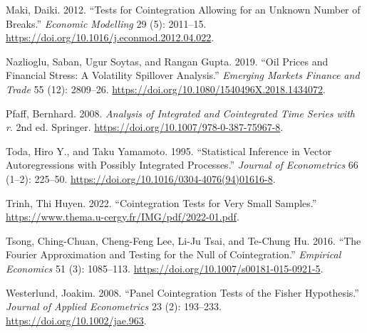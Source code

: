 \begin{CSLReferences}{1}{1}
Maki, Daiki. 2012. {``Tests for Cointegration Allowing for an Unknown
Number of Breaks.''} \emph{Economic Modelling} 29 (5): 2011--15.
\url{https://doi.org/10.1016/j.econmod.2012.04.022}.

Nazlioglu, Saban, Ugur Soytas, and Rangan Gupta. 2019. {``Oil Prices and
Financial Stress: A Volatility Spillover Analysis.''} \emph{Emerging
Markets Finance and Trade} 55 (12): 2809--26.
\url{https://doi.org/10.1080/1540496X.2018.1434072}.

Pfaff, Bernhard. 2008. \emph{Analysis of Integrated and Cointegrated
Time Series with r}. 2nd ed. Springer.
\url{https://doi.org/10.1007/978-0-387-75967-8}.

Toda, Hiro Y., and Taku Yamamoto. 1995. {``Statistical Inference in
Vector Autoregressions with Possibly Integrated Processes.''}
\emph{Journal of Econometrics} 66 (1--2): 225--50.
\url{https://doi.org/10.1016/0304-4076(94)01616-8}.

Trinh, Thi Huyen. 2022. {``Cointegration Tests for Very Small
Samples.''} \url{https://www.thema.u-cergy.fr/IMG/pdf/2022-01.pdf}.

Tsong, Ching-Chuan, Cheng-Feng Lee, Li-Ju Tsai, and Te-Chung Hu. 2016.
{``The {Fourier} Approximation and Testing for the Null of
Cointegration.''} \emph{Empirical Economics} 51 (3): 1085--113.
\url{https://doi.org/10.1007/s00181-015-0921-5}.

Westerlund, Joakim. 2008. {``Panel Cointegration Tests of the {Fisher}
Hypothesis.''} \emph{Journal of Applied Econometrics} 23 (2): 193--233.
\url{https://doi.org/10.1002/jae.963}.

\end{CSLReferences}
